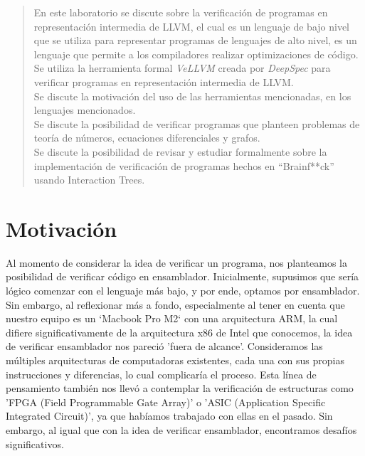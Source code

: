 \documentclass{hw-template}
\begin{document}
\maketitle
\begin{abstract}
    En este laboratorio se discute sobre la verificación de programas en
    representación intermedia de LLVM, el cual es un lenguaje de bajo nivel
    que se utiliza para representar programas de lenguajes de alto nivel,
    es un lenguaje que permite a los compiladores realizar optimizaciones
    de código. \\
    Se utiliza la herramienta formal \textit{VeLLVM} creada por
    \textit{DeepSpec} para verificar programas en representación intermedia
    de LLVM. \\
    Se discute la motivación del uso de las herramientas mencionadas, en 
    los lenguajes mencionados. \\ 
    Se discute la posibilidad de verificar programas que planteen problemas
    de teoría de números, ecuaciones diferenciales y grafos. \\
    Se discute la posibilidad de revisar y estudiar formalmente sobre la 
    implementación de verificación de programas hechos en ``Brainf**ck''
    usando Interaction Trees.
\end{abstract}

\tableofcontents

\clearpage

\section{Motivación}
Al momento de considerar la idea de verificar un programa, nos planteamos
la posibilidad de verificar código en ensamblador. Inicialmente, supusimos
que sería lógico comenzar con el lenguaje más bajo, y por ende, optamos
por ensamblador. Sin embargo, al reflexionar más a fondo, especialmente al
tener en cuenta que nuestro equipo es un `Macbook Pro M2` con una
arquitectura ARM, la cual difiere significativamente de la arquitectura x86
de Intel que conocemos, la idea de verificar ensamblador nos pareció 
'fuera de alcance'. Consideramos las múltiples arquitecturas de computadoras
existentes, cada una con sus propias instrucciones y diferencias, lo cual
complicaría el proceso. Esta línea de pensamiento también nos llevó a
contemplar la verificación de estructuras como 'FPGA (Field Programmable
Gate Array)' o 'ASIC (Application Specific Integrated Circuit)', ya que
habíamos trabajado con ellas en el pasado. Sin embargo, al igual que con
la idea de verificar ensamblador, encontramos desafíos significativos. \\
\end{document}
